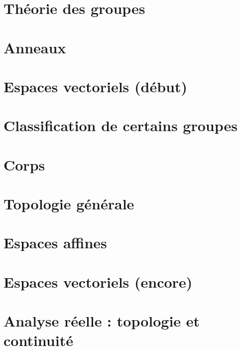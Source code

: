 \documentclass[a4paper,twoside,11pt]{book}
\begin{document}
\chapter{Théorie des groupes}



\chapter{Anneaux}



\chapter{Espaces vectoriels (début)}




\chapter{Classification de certains groupes}


\chapter{Corps}




\chapter{Topologie générale}






\chapter{Espaces affines}


\chapter{Espaces vectoriels (encore)}









\chapter{Analyse réelle : topologie et continuité}



\end{document}
